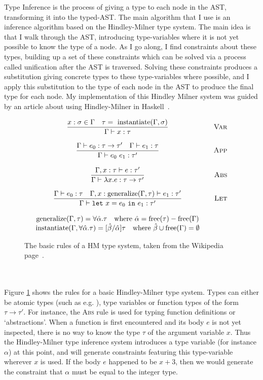 Type Inference is the process of giving a type to each node in the AST, transforming it into the typed-AST. The main algorithm that I use is an inference algorithm based on the Hindley-Milner type system. The main idea is that I walk through the AST, introducing type-variables where it is not yet possible to know the type of a node. As I go along, I find constraints about these types, building up a set of these constraints which can be solved via a process called unification after the AST is traversed. Solving these constraints produces a substitution giving concrete types to these type-variables where possible, and I apply this substitution to the type of each node in the AST to produce the final type for each node. My implementation of this Hindley Milner system was guided by an article about using Hindley-Milner in Haskell~\cite{Hmi}.
\begin{figure}[h]
    $$\begin{array}{clr}
    \dfrac{x : \sigma \in \Gamma \quad \tau =\ \text{instantiate}(\Gamma, \sigma)}{\Gamma \vdash x : \tau} && \textsc{Var} \\\\
    \dfrac{\Gamma \vdash e_0 : \tau \rightarrow \tau' \quad \Gamma \vdash e_1 : \tau}{\Gamma \vdash e_0\ e_1 : \tau'} && \textsc{App} \\\\
    \dfrac{\Gamma, x : \tau \vdash e : \tau'}{\Gamma \vdash \lambda x . e : \tau \rightarrow \tau'} && \textsc{Abs} \\\\
    \dfrac{\Gamma \vdash e_0 : \tau \quad \Gamma, x : \text{generalize}(\Gamma, \tau) \vdash e_1 : \tau'}{\Gamma \vdash \mathtt{let}\ x = e_0\ \mathtt{in}\ e_1 : \tau'} && \textsc{Let} \\\\
    \text{generalize}(\Gamma, \tau) = \forall \hat{\alpha} . \tau \quad \text{where}\ \hat{\alpha} = \text{free}(\tau) - \text{free}(\Gamma) && \\
    \text{instantiate}(\Gamma, \forall \hat{\alpha} . \tau) = [\hat{\beta} / \hat{\alpha}]\tau \quad \text{where}\ \hat{\beta} \cup \text{free}(\Gamma) = \emptyset
    
\end{array}$$
\caption{The basic rules of a HM type system, taken from the Wikipedia page~\cite{Hmts}.}
\label{fig:hm}
\end{figure}
\\\\
Figure \ref{fig:hm} shows the rules for a basic Hindley-Milner type system. Types can either be atomic types (such as e.g. ), type variables or function types of the form $\tau \rightarrow \tau'$. For instance, the \textsc{Abs} rule is used for typing function definitions or `abstractions'. When a function is first encountered and its body $e$ is not yet inspected, there is no way to know the type $\tau$ of the argument variable $x$. Thus the Hindley-Milner type inference system introduces a type variable (for instance $\alpha$) at this point, and will generate constraints featuring this type-variable wherever $x$ is used. If the body $e$ happened to be $x + 3$, then we would generate the constraint that $\alpha$ must be equal to the integer type.
